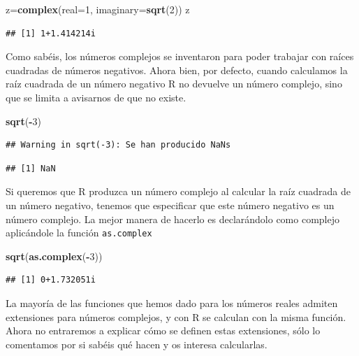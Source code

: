 \documentclass[]{book}
\newenvironment{Shaded}{\begin{snugshade}}{\end{snugshade}}
\newcommand{\DataTypeTok}[1]{\textcolor[rgb]{0.13,0.29,0.53}{#1}}
\newcommand{\DecValTok}[1]{\textcolor[rgb]{0.00,0.00,0.81}{#1}}
\newcommand{\KeywordTok}[1]{\textcolor[rgb]{0.13,0.29,0.53}{\textbf{#1}}}
\newcommand{\NormalTok}[1]{#1}
\newcommand{\OperatorTok}[1]{\textcolor[rgb]{0.81,0.36,0.00}{\textbf{#1}}}
\theoremstyle{definition}
\theoremstyle{definition}
\theoremstyle{definition}
\theoremstyle{remark}
\begin{document}
\begin{Shaded}
\begin{Highlighting}[]
\NormalTok{z=}\KeywordTok{complex}\NormalTok{(}\DataTypeTok{real=}\DecValTok{1}\NormalTok{, }\DataTypeTok{imaginary=}\KeywordTok{sqrt}\NormalTok{(}\DecValTok{2}\NormalTok{))}
\NormalTok{z}
\end{Highlighting}
\end{Shaded}

\begin{verbatim}
## [1] 1+1.414214i
\end{verbatim}

Como sabéis, los números complejos se inventaron para poder trabajar con raíces cuadradas de números negativos. Ahora bien, por defecto, cuando calculamos la raíz cuadrada de un número negativo R no devuelve un número complejo, sino que se limita a avisarnos de que no existe.

\begin{Shaded}
\begin{Highlighting}[]
\KeywordTok{sqrt}\NormalTok{(}\OperatorTok{-}\DecValTok{3}\NormalTok{)}
\end{Highlighting}
\end{Shaded}

\begin{verbatim}
## Warning in sqrt(-3): Se han producido NaNs
\end{verbatim}

\begin{verbatim}
## [1] NaN
\end{verbatim}

Si queremos que R produzca un número complejo al calcular la raíz cuadrada de un número negativo, tenemos que especificar que este número negativo es un número complejo. La mejor manera de hacerlo es declarándolo como complejo aplicándole la función \texttt{as.complex}

\begin{Shaded}
\begin{Highlighting}[]
\KeywordTok{sqrt}\NormalTok{(}\KeywordTok{as.complex}\NormalTok{(}\OperatorTok{-}\DecValTok{3}\NormalTok{))}
\end{Highlighting}
\end{Shaded}

\begin{verbatim}
## [1] 0+1.732051i
\end{verbatim}

La mayoría de las funciones que hemos dado para los números reales admiten extensiones para números complejos, y con R se calculan con la misma función. Ahora no entraremos a explicar cómo se definen estas extensiones, sólo lo comentamos por si sabéis qué hacen y os interesa calcularlas.
\end{document}
